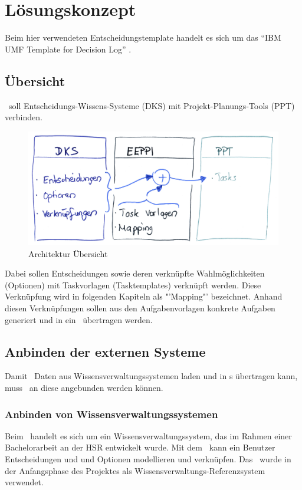 \chapter{Lösungskonzept}
	
	Beim hier verwendeten Entscheidungstemplate handelt es sich um das "`IBM UMF Template for Decision Log"' \cite{hand_ibm_2008}.
	
	\section{Übersicht}
		\eeppi\ soll Entscheidungs-Wissens-Systeme (DKS) mit 
		Projekt-Planungs-Tools (PPT) verbinden.
		
		\begin{figure}[H]
			\includegraphics[width=\textwidth]{architecture/media/img/eeppiSchema.jpg}
			\centering
			\caption{Architektur Übersicht}
			\label{fig:architectureSchema}
		\end{figure}	
		
		Dabei sollen Entscheidungen sowie deren verknüpfte Wahlmöglichkeiten (Optionen) mit Taskvorlagen (Tasktemplates) verknüpft werden.
		Diese Verknüpfung wird in folgenden Kapiteln als "'Mapping"' bezeichnet. 
		Anhand diesen Verknüpfungen sollen aus den Aufgabenvorlagen konkrete Aufgaben generiert und in ein \ppt\ übertragen werden.
	
	
	\section{Anbinden der externen Systeme}
		Damit \eeppi\ Daten aus Wissensverwaltungssystemen laden und in \ppt s übertragen kann, muss \eeppi\ an diese angebunden werden können.
		
	
		\subsection{Anbinden von Wissensverwaltungssystemen}
			Beim \cdar\ handelt es sich um ein Wissensverwaltungssystem, 
			das im Rahmen einer Bachelorarbeit an der HSR entwickelt wurde. Mit dem \cdar\ kann ein Benutzer Entscheidungen und und Optionen modellieren und verknüpfen. Das \cdar\ wurde in der Anfangsphase des Projektes als Wissensverwaltungs-Referenzsystem verwendet.
			
